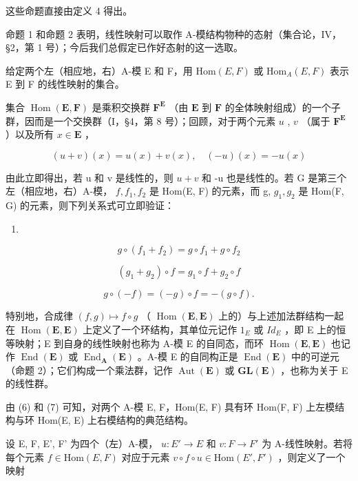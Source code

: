 这些命题直接由定义 4 得出。

命题 1 和命题 2 表明，线性映射可以取作 A-模结构物种的态射（集合论，IV，§2，第 1 号）；今后我们总假定已作好态射的这一选取。

给定两个左（相应地，右）A-模 E 和 F，用 \(\text{Hom}(E, F)\) 或 \(\text{Hom}_{A}(E, F)\) 表示 E 到 F 的线性映射的集合。

集合 \(\operatorname{Hom}(\mathbf{E},\mathbf{F})\) 是乘积交换群 \(\mathbf{F}^{\mathbf{E}}\) （由 \(\mathbf{E}\) 到 \(\mathbf{F}\) 的全体映射组成）的一个子群，因而是一个交换群（I，§4，第 8 号）；回顾，对于两个元素 \(u\) , \(v\) （属于 \(\mathbf{F}^{\mathbf{E}}\) ）以及所有 \(x\in\mathbf{E}\) ，

\[
(u + v) (x) = u (x) + v (x), \quad (- u) (x) = - u (x)
\]

由此立即得出，若 u 和 v 是线性的，则 \(u + v\) 和 -u 也是线性的。若 G 是第三个左（相应地，右）A-模， \(f, f_{1}, f_{2}\) 是 Hom(E, F) 的元素，而 g, \(g_{1}, g_{2}\) 是 Hom(F, G) 的元素，则下列关系式可立即验证：

\begin{enumerate}
\def\labelenumi{(\arabic{enumi})}
\setcounter{enumi}{5}
\tightlist
\item
\end{enumerate}

\[
g \circ (f _ {1} + f _ {2}) = g \circ f _ {1} + g \circ f _ {2}\tag{7}
\]

\[
\left(g _ {1} + g _ {2}\right) \circ f = g _ {1} \circ f + g _ {2} \circ f\tag{8}
\]

\[
g \circ (- f) = (- g) \circ f = - (g \circ f).
\]

特别地，合成律 \((f,g)\mapsto f\circ g\) （ \(\operatorname{Hom}(\mathbf{E},\mathbf{E})\) 上的）与上述加法群结构一起在 \(\operatorname{Hom}(\mathbf{E},\mathbf{E})\) 上定义了一个环结构，其单位元记作 \(1_{E}\) 或 \(Id_{E}\) ，即 E 上的恒等映射；E 到自身的线性映射也称为 A-模 E 的自同态，而环 \(\operatorname{Hom}(\mathbf{E},\mathbf{E})\) 也记作 \(\operatorname{End}(\mathbf{E})\) 或 \(\operatorname{End}_{\mathbf{A}}(\mathbf{E})\) 。A-模 E 的自同构正是 \(\operatorname{End}(\mathbf{E})\) 中的可逆元（命题 2）；它们构成一个乘法群，记作 \(\operatorname{Aut}(\mathbf{E})\) 或 \(\mathbf{GL}(\mathbf{E})\) ，也称为关于 E 的线性群。

由 (6) 和 (7) 可知，对两个 A-模 E, F，Hom(E, F) 具有环 Hom(F, F) 上左模结构与环 Hom(E, E) 上右模结构的典范结构。

设 E, F, E', F' 为四个（左）A-模， \(u: E' \to E\) 和 \(v: F \to F'\) 为 A-线性映射。若将每个元素 \(f \in \text{Hom}(E, F)\) 对应于元素 \(v \circ f \circ u \in \text{Hom}(E', F')\) ，则定义了一个映射

